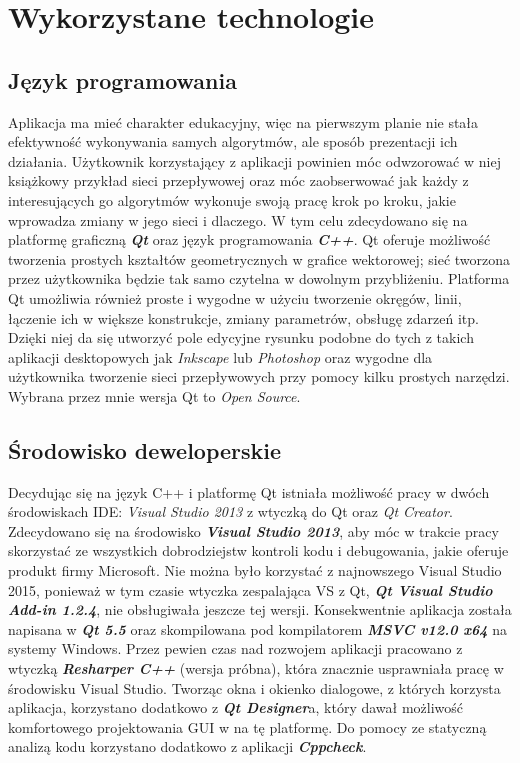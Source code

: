 \section{Wykorzystane technologie}
\subsection{Język programowania}\label{ssec:technologieJezyk}
Aplikacja ma mieć charakter edukacyjny, więc na pierwszym planie nie stała efektywność wykonywania samych algorytmów, ale sposób prezentacji ich działania. Użytkownik korzystający z aplikacji powinien móc odwzorować w niej książkowy przykład sieci przepływowej oraz móc zaobserwować jak każdy z interesujących go algorytmów wykonuje swoją pracę krok po kroku, jakie wprowadza zmiany w jego sieci i dlaczego. W tym celu zdecydowano się na platformę graficzną \textbf{\textit{Qt}} oraz język programowania \textbf{\textit{C++}}. Qt oferuje możliwość tworzenia prostych kształtów geometrycznych w grafice wektorowej; sieć tworzona przez użytkownika będzie tak samo czytelna w dowolnym przybliżeniu. Platforma Qt umożliwia również proste i wygodne w użyciu tworzenie okręgów, linii, łączenie ich w większe konstrukcje, zmiany parametrów, obsługę zdarzeń itp. Dzięki niej da się utworzyć pole edycyjne rysunku podobne do tych z takich aplikacji desktopowych jak \textit{Inkscape} lub \textit{Photoshop} oraz wygodne dla użytkownika tworzenie sieci przepływowych przy pomocy kilku prostych narzędzi. Wybrana przez mnie wersja Qt to \emph{Open Source}.
\subsection{Środowisko deweloperskie}
Decydując się na język C++ i platformę Qt istniała możliwość pracy w dwóch środowiskach IDE: \textit{Visual Studio 2013} z wtyczką do Qt oraz \textit{Qt Creator}. Zdecydowano się na środowisko \textit{\textbf{Visual Studio 2013}}, aby móc w trakcie pracy skorzystać ze wszystkich dobrodziejstw kontroli kodu i debugowania, jakie oferuje produkt firmy Microsoft. Nie można było korzystać z najnowszego Visual Studio 2015, ponieważ w tym czasie wtyczka zespalająca VS z Qt, \textbf{\textit{Qt Visual Studio Add-in 1.2.4}}, nie obsługiwała jeszcze tej wersji. Konsekwentnie aplikacja została napisana w \textit{\textbf{Qt 5.5}} oraz skompilowana pod kompilatorem \textbf{\textit{MSVC v12.0 x64}} na systemy Windows. Przez pewien czas nad rozwojem aplikacji pracowano z wtyczką \textbf{\textit{Resharper C++}} (wersja próbna), która znacznie usprawniała pracę w środowisku Visual Studio. Tworząc okna i okienko dialogowe, z których korzysta aplikacja, korzystano dodatkowo z \textbf{\textit{Qt Designer}}a, który dawał możliwość komfortowego projektowania GUI w na tę platformę. Do pomocy ze statyczną analizą kodu korzystano dodatkowo z aplikacji \textbf{\textit{Cppcheck}}.
